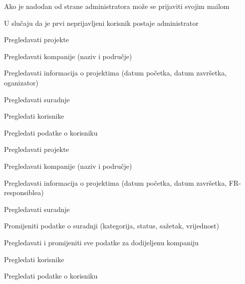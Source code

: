 			
			\begin{packed_enum}
				\item  {}

				\begin{packed_enum}

					\item Ako je nadodan od strane administratora može se prijaviti svojim mailom
					\item U slučaju da je prvi neprijavljeni korisnik postaje administrator

				\end{packed_enum}

				\item  {}
				
				\begin{packed_enum}
					
					\item Pregledavati projekte
					\item Pregledavati kompanije (naziv i područje)
					\item Pregledavati informacija o projektima (datum početka, datum završetka, oganizator)
					\item Pregledavati suradnje
					\item Pregledati korisnike
					\item Pregledati podatke o korisniku
					
				\end{packed_enum}

				\item  {}

				\begin{packed_enum}

					\item Pregledavati projekte
					\item Pregledavati kompanije (naziv i područje)
					\item Pregledavati informacija o projektima (datum početka, datum završetka, FR- responsiblea)
					\item Pregledavati suradnje
					\item Promijeniti podatke o suradnji (kategorija, status, sažetak, vrijednost)
					\item Pregledavati i promijeniti sve podatke za dodijeljenu kompaniju
					\item Pregledati korisnike
					\item Pregledati podatke o korisniku


\end{packed_enum}
\end{packed_enum}
